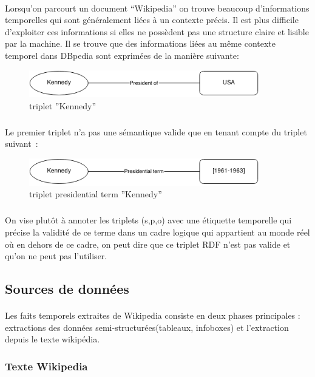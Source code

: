 \paragraph{}
Lorsqu’on parcourt un document “Wikipedia” on trouve beaucoup d’informations temporelles qui sont généralement liées à un contexte précis.
Il est plus difficile d’exploiter ces informations si elles ne possèdent pas une structure claire et lisible par la machine.
\newline
Il se trouve que des informations liées au même contexte temporel dans DBpedia sont exprimées de la manière suivante: 
\begin{figure}[H]
        \centering
                \centering
                \includegraphics[width=10cm]{ken.png}
               \caption{triplet ''Kennedy''}

\end{figure}
\subparagraph{}
Le premier triplet n'a pas une sémantique valide que en tenant compte du triplet suivant~: 
\begin{figure}[H]
        \centering
                \centering
                \includegraphics[width=10cm]{presidterm.png}
               \caption{triplet presidential term ''Kennedy''}

\end{figure}
\subparagraph{}
On vise plutôt à annoter les triplets (s,p,o) avec une étiquette temporelle qui précise la validité de ce terme dans un cadre logique qui appartient au monde réel où en dehors de ce cadre, on peut dire que ce triplet RDF n’est pas valide et qu’on ne peut pas l’utiliser.
\subsection*{Sources de données}
\paragraph{}
Les faits temporels extraites de Wikipedia consiste en deux phases principales : extractions des données semi-structurées(tableaux, infoboxes) et l’extraction depuis le texte wikipédia.
\subsubsection*{Texte Wikipedia}
